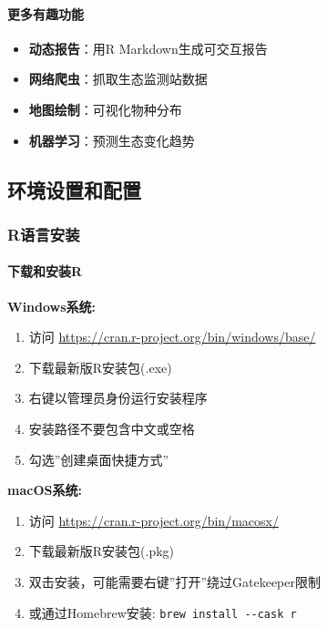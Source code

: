 \documentclass[
  twoside]{book}
\providecommand{\tightlist}{%
  \setlength{\itemsep}{0pt}\setlength{\parskip}{0pt}}
\begin{document}
\hypertarget{ux66f4ux591aux6709ux8da3ux529fux80fd}{%
\paragraph{更多有趣功能}\label{ux66f4ux591aux6709ux8da3ux529fux80fd}}

\begin{itemize}
\tightlist
\item
  \textbf{动态报告}：用R Markdown生成可交互报告
\item
  \textbf{网络爬虫}：抓取生态监测站数据
\item
  \textbf{地图绘制}：可视化物种分布
\item
  \textbf{机器学习}：预测生态变化趋势
\end{itemize}

\hypertarget{ux73afux5883ux8bbeux7f6eux548cux914dux7f6e}{%
\subsection{环境设置和配置}\label{ux73afux5883ux8bbeux7f6eux548cux914dux7f6e}}

\hypertarget{rux8bedux8a00ux5b89ux88c5}{%
\subsubsection{R语言安装}\label{rux8bedux8a00ux5b89ux88c5}}

\hypertarget{ux4e0bux8f7dux548cux5b89ux88c5r}{%
\paragraph{下载和安装R}\label{ux4e0bux8f7dux548cux5b89ux88c5r}}

\textbf{Windows系统:}

\begin{enumerate}
\def\labelenumi{\arabic{enumi}.}
\item
  访问 \url{https://cran.r-project.org/bin/windows/base/}
\item
  下载最新版R安装包(.exe)
\item
  右键以管理员身份运行安装程序
\item
  安装路径不要包含中文或空格
\item
  勾选''创建桌面快捷方式''
\end{enumerate}

\textbf{macOS系统:}

\begin{enumerate}
\def\labelenumi{\arabic{enumi}.}
\item
  访问 \url{https://cran.r-project.org/bin/macosx/}
\item
  下载最新版R安装包(.pkg)
\item
  双击安装，可能需要右键''打开''绕过Gatekeeper限制
\item
  或通过Homebrew安装: \texttt{brew\ install\ -\/-cask\ r}
\end{enumerate}
\end{document}
